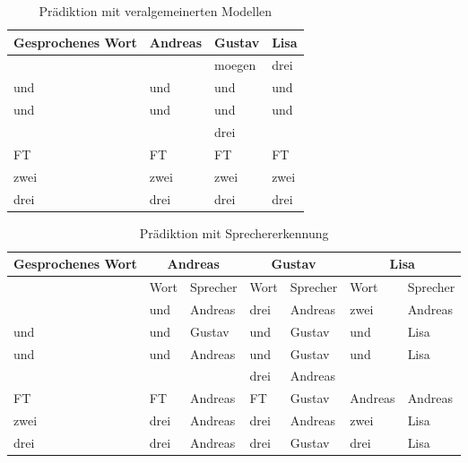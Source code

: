 \newpage

\begin{table}[!hp]
\centering
{}
\begin{tabular}{|l||l|l|l|}
\hline
Gesprochenes Wort & Andreas & Gustav & Lisa 		\\\hline\hline
				   & 		 & moegen & drei	\\ \hline
und       		   & und 	 & und	  & und		\\ \hline
und				   & und  	 & und	  & und			\\ \hline
				   & 		 & drei	  & \\ \hline
FT 				   & FT 	 & FT 	  & FT\\ \hline
zwei			   & zwei 	 & zwei   & zwei	\\ \hline
drei			   & drei	 & drei   & drei	\\ \hline
\end{tabular}
\caption[Prädiktion mit veralgemeinerten Modellen]{Prädiktion mit veralgemeinerten Modellen}
\label{tab:predict_ALL_2}
\end{table}

\begin{table}[!hp]
\centering
{}
\begin{tabular}{|l||l|l|l|l|l|l|}
\hline
Gesprochenes Wort & \multicolumn{2}{|c|}{Andreas} & \multicolumn{2}{|c|}{Gustav} & \multicolumn{2}{|c|}{Lisa} \\\hline
	& Wort & Sprecher & Wort & Sprecher & Wort   & Sprecher \\ \hline \hline
	& und  & Andreas  & drei & Andreas  & zwei   & Andreas	\\ \hline
und & und  & Gustav	  & und	 & Gustav   & und    & Lisa	\\ \hline
und	& und  & Andreas  & und	 & Gustav   & und    & Lisa	\\ \hline
	& 	   & 		  & drei & Andreas  & 	     & 	\\ \hline
FT 	&  FT  & Andreas  & FT 	 & Gustav   & Andreas& Andreas \\ \hline
zwei& drei & Andreas  & drei & Andreas  & zwei   & Lisa \\ \hline
drei& drei & Andreas  & drei & Gustav   & drei   & Lisa \\ \hline
\end{tabular}
\caption[Prädiktion mit Sprechererkennung]{Prädiktion mit Sprechererkennung}
\label{tab:predict_ALL_2}
\end{table}



